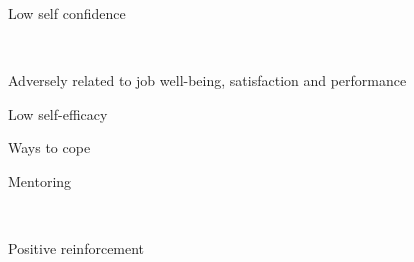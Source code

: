 \documentclass[aspectratio=169]{beamer}
\begin{document}
\begin{frame}
  \begin{center}
    \Huge Low self confidence

    \\ \small \cite{hh15}
  \end{center}
\end{frame}

\begin{frame}
  \begin{center}
    \Huge Adversely related to job well-being, satisfaction and performance
    \\ \small \cite{hh15}
  \end{center}
\end{frame}

\begin{frame}
  \begin{center}
    \Huge Low self-efficacy
    \\ \small \cite{feedback}
  \end{center}
\end{frame}



\begin{frame}
  \begin{center}
    \Huge Ways to cope
  \end{center}
\end{frame}

\begin{frame}
  \begin{center}
    \Huge Mentoring

    \\ \small \cite{hh15}
  \end{center}
\end{frame}

\begin{frame}
  \begin{center}
    \Huge Positive reinforcement
    \\ \small \cite{hh15}
  \end{center}
\end{frame}
\end{document}
